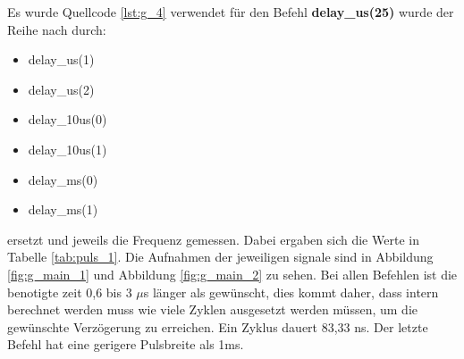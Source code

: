 \documentclass[12pt,a4paper]{article}
\begin{document}
Es wurde Quellcode \ref{lst:g_4} verwendet für den Befehl \textbf{delay\_us(25)} wurde der Reihe nach durch:

\begin{itemize}
\item	delay\_us(1)

\item	delay\_us(2)

\item	delay\_10us(0)

\item	delay\_10us(1)

\item	delay\_ms(0)

\item	delay\_ms(1)
\end{itemize}

ersetzt und jeweils die Frequenz gemessen. Dabei ergaben sich die Werte in Tabelle \ref{tab:puls_1}. Die Aufnahmen der jeweiligen signale sind in Abbildung \ref{fig:g_main_1} und Abbildung \ref{fig:g_main_2} zu sehen. Bei allen Befehlen ist die benotigte zeit 0,6 bis 3 $\mu$s länger als gewünscht, dies kommt daher, dass intern berechnet werden muss wie viele Zyklen ausgesetzt werden müssen, um die gewünschte Verzögerung zu erreichen. Ein Zyklus dauert 83,33 ns. Der letzte Befehl hat eine gerigere Pulsbreite als 1ms.
\end{document}
